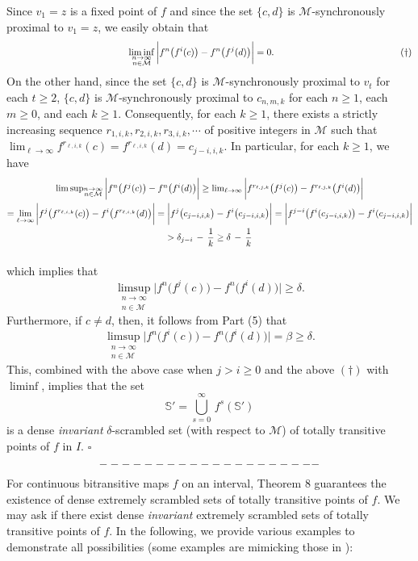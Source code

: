 \documentclass[12pt]{article}
\newcommand{\sq}{$\square$}
\begin{document}
Since $v_1 = z$ is a fixed point of $f$ and since the set $\{ c, d \}$ is $\mathcal M$-synchronously proximal to $v_1 = z$, we easily obtain that 
$$
\quad\qquad\qquad\qquad\qquad\qquad\quad\quad \liminf_{\substack{n \to \infty \\ n \in \mathcal M}} \bigg|f^n\big(f^i(c)\big) - f^n\big(f^j(d)\big)\bigg| = 0. \,\,\,\quad\qquad\qquad\qquad\qquad\qquad\qquad (\dagger) \vspace{.1in}
$$
\indent On the other hand, since the set $\{ c, d \}$ is $\mathcal M$-synchronously proximal to $v_t$ for each $t \ge 2$, $\{ c, d \}$ is $\mathcal M$-synchronously proximal to $c_{n,m,k}$ for each $n \ge 1$, each $m \ge 0$, and each $k \ge 1$.  Consequently, for each $k \ge 1$, there exists a strictly increasing sequence $r_{1,i,k}, r_{2,i,k}, r_{3,i,k}, \cdots$ of positive integers in $\mathcal M$ such that $\lim_{\ell \to \infty} f^{r_{\ell,i,k}}(c) = f^{r_{\ell,i,k}}(d) = c_{j-i, i,k}$.  In particular, for each $k \ge 1$, we have    
\begin{multline*}
$$
\limsup_{\substack{n \to \infty \\ n \in \mathcal M}} \bigg|f^n\big(f^j(c)\big) - f^n\big(f^i(d)\big)\bigg| \ge \lim_{\ell \to \infty} \bigg|f^{r_{\ell,j,k}}\big(f^j(c)\big) - f^{r_{\ell,j,k}}\big(f^i(d)\big)\bigg| \\
= \lim_{\ell \to \infty} \bigg|f^j\big(f^{r_{\ell,i,k}}(c)\big) - f^i\big(f^{r_{\ell,i,k}}(d)\big)\bigg|  
= \bigg|f^j\big(c_{j-i,i,k}\big) - f^i\big(c_{j-i,i,k}\big)\bigg| = \bigg|f^{j-i}\big(f^i(c_{j-i,i,k})\big) - f^i(c_{j-i,i,k})\bigg| \\
> \delta_{j-i} \, - \, \frac 1k \ge \delta \, - \, \frac 1k\vspace{.15in}
$$
\end{multline*}
which implies that 
$$
\limsup_{\substack{n \to \infty \\ n \in \mathcal M}} \bigg|f^n\big(f^j(c)\big) - f^n\big(f^i(d)\big)\bigg| \ge \delta.
$$
\indent Furthermore, if $c \ne d$, then, it follows from Part (5) that
$$
\limsup_{\substack{n \to \infty \\ n \in \mathcal M}} \bigg|f^n\big(f^i(c)\big) - f^n\big(f^i(d)\big)\bigg| = \beta \ge \delta.
$$
\indent This, combined with the above case when $j > i \ge 0$ and the above $(\dagger)$ with $\liminf$, implies that the set 
$$
\widehat {\mathbb S'} = \bigcup_{s=0}^\infty \, f^s(\mathbb S')
$$
is a dense {\it invariant} $\delta$-scrambled set (with respect to $\mathcal M$) of totally transitive points of $f$ in $I$.
\hfill\sq
$$--------------------\vspace{.1in}$$
\indent For continuous bitransitive maps $f$ on an interval, Theorem 8 guarantees the existence of dense extremely scrambled sets of totally transitive points of $f$.  We may ask if there exist dense {\it invariant} extremely scrambled sets of totally transitive points of $f$.  In the following, we provide various examples to demonstrate all possibilities (some examples are mimicking those in {\bf\cite{bo, c}}):  
\end{document}
